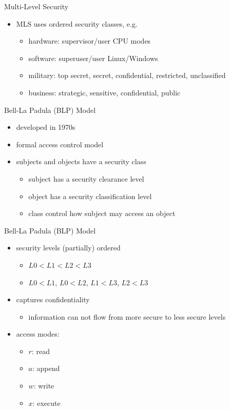 \documentclass{beamer}
\begin{document}
\begin{frame}{Multi-Level Security}
  \begin{itemize}
  \item MLS uses ordered security classes, e.g.
    \begin{itemize}
    \item hardware: supervisor/user CPU modes
    \item software: superuser/user Linux/Windows
    \item military: top secret, secret, confidential, restricted, unclassified 
    \item business: strategic, sensitive, confidential, public
    \end{itemize}
  \end{itemize}
\end{frame}

\begin{frame}{Bell-La Padula (BLP) Model}
  \begin{itemize}
  \item developed in 1970s
  \item formal access control model
  \item subjects and objects have a \alert{security class}
    \begin{itemize}
    \item subject has a \alert{security clearance} level
    \item object has a \alert{security classification} level
    \item class control how subject may access an object
    \end{itemize}
  \end{itemize}
\end{frame}

\begin{frame}{Bell-La Padula (BLP) Model}
  \begin{itemize}
  \item security levels (partially) ordered
    \begin{itemize}
    \item $L0 < L1 < L2 < L3$
    \item $L0 < L1$, $L0 < L2$, $L1 < L3$, $L2 < L3$
    \end{itemize}
  \item captures \alert{confidentiality}
    \begin{itemize}
      \item information can not flow from more secure to 
        less secure levels
    \end{itemize}
    \item access modes:
    \begin{itemize}
    \item $r$: read
    \item $a$: append
    \item $w$: write
    \item $x$: execute
    \end{itemize}
  \end{itemize}
\end{frame}
\end{document}
